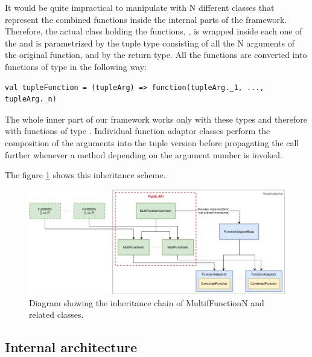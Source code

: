It would be quite impractical to manipulate with N different classes that represent the combined functions inside the internal parts of the framework. Therefore, the actual class holding the functions, , is wrapped inside each one of the  and is parametrized by the tuple type consisting of all the N arguments of the original function, and by the return type. All the functions are converted into functions of type  in the following way:

\lstset{style=Scala}
\begin{lstlisting}
val tupleFunction = (tupleArg) => function(tupleArg._1, ..., tupleArg._n)
\end{lstlisting}
	
The whole inner part of our framework works only with these  types and therefore with functions of type . Individual function adaptor classes perform the composition of the arguments into the tuple version before propagating the call further whenever a method depending on the argument number is invoked.

The figure \ref{fig:inheritance_function_adaptors} shows this inheritance scheme.

\begin{figure}[h!]
	\captionsetup{justification=centering,margin=0.5cm}
	\centerline{\mbox{\includegraphics[width=140mm]{./img/inheritance_function_adaptors.png}}}
	\caption{Diagram showing the inheritance chain of MultifFunctionN and related classes.}
	\label{fig:inheritance_function_adaptors}
\end{figure}

\subsection{Internal architecture}
\label{subsec:internal_architecture}

